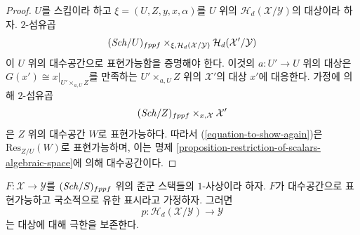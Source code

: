 \begin{proof}
$U$를 스킴이라 하고 $\xi = (U, Z, y, x, \alpha)$를 $U$ 위의
$\mathcal{H}_d(\mathcal{X}/\mathcal{Y})$의 대상이라 하자.
$2$-섬유곱
\begin{equation}
\label{equation-to-show-again}
(\mathit{Sch}/U)_{fppf}
\times_{\xi, \mathcal{H}_d(\mathcal{X}/\mathcal{Y})}
\mathcal{H}_d(\mathcal{X}'/\mathcal{Y})
\end{equation}
이 $U$ 위의 대수공간으로 표현가능함을 증명해야 한다.
이것의 $a : U' \to U$ 위의 대상은
$G(x') \cong x|_{U' \times_{a, U} Z}$를 만족하는
$U' \times_{a, U} Z$ 위의 $\mathcal{X}'$의 대상 $x'$에 대응한다.
가정에 의해 $2$-섬유곱
$$
(\mathit{Sch}/Z)_{fppf} \times_{x, \mathcal{X}} \mathcal{X}'
$$
은 $Z$ 위의 대수공간 $W$로 표현가능하다. 따라서
(\ref{equation-to-show-again})은 $\text{Res}_{Z/U}(W)$로 표현가능하며,
이는 명제 \ref{proposition-restriction-of-scalars-algebraic-space}에
의해 대수공간이다.
\end{proof}

\begin{lemma}
\label{lemma-limit-preserving}
$F : \mathcal{X} \to \mathcal{Y}$를 $(\mathit{Sch}/S)_{fppf}$ 위의
준군 스택들의 $1$-사상이라 하자. $F$가 대수공간으로 표현가능하고
국소적으로 유한 표시라고 가정하자. 그러면
$$
p : \mathcal{H}_d(\mathcal{X}/\mathcal{Y}) \to \mathcal{Y}
$$
는 대상에 대해 극한을 보존한다.
\end{lemma}

